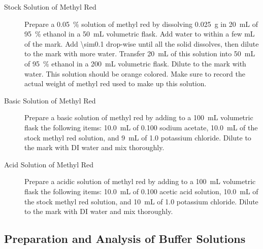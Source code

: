 \begin{description}
	\item[Stock Solution of Methyl Red] 
	Prepare a \qty{0.05}{\percent} solution of methyl red by dissolving \qty{0.025}{\gram} in \qty{20}{\mL} of \qty{95}{\percent} ethanol in a \qty{50}{\mL} volumetric flask. 
	Add water to within a few \unit{\mL} of the mark. 
	Add \qty{\sim0.1}{\Molar}  drop-wise until all the solid dissolves, then dilute to the mark with more water. 
	Transfer \qty{20}{\mL} of this solution into \qty{50}{\mL} of \qty{95}{\percent} ethanol in a \qty{200}{\mL} volumetric flask. 
	Dilute to the mark with water. 
	This solution should be orange colored. 
	Make sure to record the actual weight of methyl red used to make up this solution. 
	\item[Basic Solution of Methyl Red] 
	Prepare a basic solution of methyl red by adding to a \qty{100}{\mL} volumetric flask the following items: \qty{10.0}{\mL} of \qty{0.100}{\Molar} sodium acetate, \qty{10.0}{\mL} of the stock methyl red solution, and \qty{9}{\mL} of \qty{1.0}{\Molar} potassium chloride.
	Dilute to the mark with DI water and mix thoroughly. 
	\item[Acid Solution of Methyl Red]
	Prepare a acidic solution of methyl red by adding to a \qty{100}{\mL} volumetric flask the following items: \qty{10.0}{\mL} of \qty{0.100}{\Molar} acetic acid solution, \qty{10.0}{\mL} of the stock methyl red solution, and \qty{10}{\mL} of \qty{1.0}{\Molar} potassium chloride.
	Dilute to the mark with DI water and mix thoroughly. 
\end{description}

\subsection{Preparation and Analysis of Buffer Solutions}
\label{subs:preparation_and_analysis_of_buffer_solutions}

